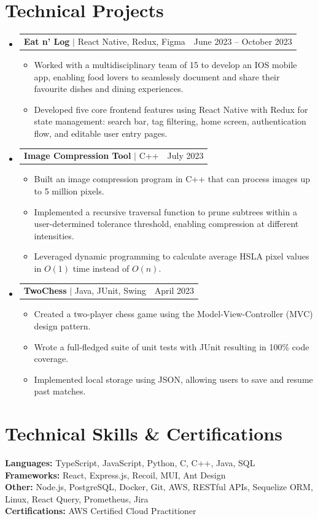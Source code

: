 \documentclass[letterpaper]{article}
\makeatletter
\newcommand{\resumeItem}[1]{
  \item\small{
    {#1 \vspace{-2pt}}
  }
}
\newcommand{\resumeProjectHeading}[2]{
    \item
    \begin{tabular*}{0.97\textwidth}{l@{\extracolsep{\fill}}r}
      \small#1 & #2 \\
    \end{tabular*}\vspace{-7pt}
}
\newcommand{\resumeSubHeadingListStart}{\begin{itemize}[leftmargin=0.15in, label={}]}
\newcommand{\resumeSubHeadingListEnd}{\end{itemize}}
\newcommand{\resumeItemListStart}{\begin{itemize}}
\newcommand{\resumeItemListEnd}{\end{itemize}\vspace{-5pt}}
\makeatother
\begin{document}
\color{NavyBlue}
\section{Technical Projects}
\color{black}
    \resumeSubHeadingListStart
      \resumeProjectHeading
        {\textbf{Eat n' Log} $|$ React Native, Redux, Figma}{June 2023 -- October 2023}
          \resumeItemListStart
            \resumeItem{Worked with a multidisciplinary team of 15 to develop an IOS mobile app, enabling food lovers to seamlessly document and share their favourite dishes and dining experiences.}
            \resumeItem{Developed five core frontend features using React Native with Redux for state management: search bar, tag filtering, home screen, authentication flow, and editable user entry pages.}
          \resumeItemListEnd

      \resumeProjectHeading
          {\textbf{Image Compression Tool} $|$ C++}{July 2023}
          \resumeItemListStart
            \resumeItem{Built an image compression program in C++ that can process images up to 5 million pixels.}
            \resumeItem{Implemented a recursive traversal function to prune subtrees within a user-determined tolerance threshold, enabling compression at different intensities.}
            \resumeItem{Leveraged dynamic programming to calculate average HSLA pixel values in $O(1)$ time instead of $O(n)$.}
          \resumeItemListEnd
      \resumeProjectHeading
          {\textbf{TwoChess} $|$ Java, JUnit, Swing}{April 2023}
          \resumeItemListStart
            \resumeItem{Created a two-player chess game using the Model-View-Controller (MVC) design pattern.}
            \resumeItem{Wrote a full-fledged suite of unit tests with JUnit resulting in 100\% code coverage.}
            \resumeItem{Implemented local storage using JSON, allowing users to save and resume past matches.}
          \resumeItemListEnd
    \resumeSubHeadingListEnd
  
\color{NavyBlue}
\section{Technical Skills \& Certifications}
\color{Black}
 \begin{itemize}[leftmargin=0.15in, label={}]
    \small{\item{
        \textbf{Languages:}{ TypeScript, JavaScript, Python, C, C++, Java, SQL} \\
        \textbf{Frameworks:}{ React, Express.js, Recoil, MUI, Ant Design} \\
        \textbf{Other:}{ Node.js, PostgreSQL, Docker, Git, AWS, RESTful APIs, Sequelize ORM, Linux, React Query, Prometheus, Jira} \\
        \textbf{Certifications:}{ AWS Certified Cloud Practitioner}
    }}
 \end{itemize}
 

\end{document}
